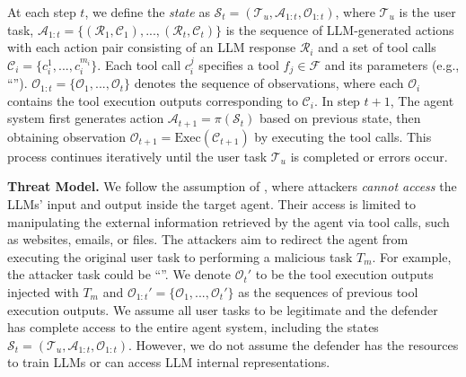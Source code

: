 At each step $t$, we define the \textit{state} as $\mathcal{S}_t = (\mathcal{T}_u, \mathcal{A}_{1:t}, \mathcal{O}_{1:t})$, where $\mathcal{T}_u$ is the user task, $\mathcal{A}_{1:t} = \{ (\mathcal{R}_1, \mathcal{C}_1), ..., (\mathcal{R}_t, \mathcal{C}_t) \}$ is the sequence of LLM-generated actions with each action pair consisting of an LLM response $\mathcal{R}_i$ and a set of tool calls $\mathcal{C}_i = \{c_i^1, ..., c_i^{m_i}\}$. Each tool call $c_i^j$ specifies a tool $f_j \in \mathcal{F}$ and its parameters (e.g., ``''). $\mathcal{O}_{1:t} = \{\mathcal{O}_1, ..., \mathcal{O}_t\}$ denotes the sequence of observations, where each $\mathcal{O}_i$ contains the tool execution outputs corresponding to $\mathcal{C}_i$. In step $t+1$, The agent system first generates action $\mathcal{A}_{t+1} = \pi(\mathcal{S}_t)$ based on previous state, then obtaining observation $\mathcal{O}_{t+1} = \text{Exec}(\mathcal{C}_{t+1})$ by executing the tool calls. This process continues iteratively until the user task $\mathcal{T}_u$ is completed or errors occur.



\textbf{Threat Model.}
We follow the assumption of \ipi, where attackers \textit{cannot access} the LLMs' input and output inside the target agent.
Their access is limited to manipulating the external information retrieved by the agent via tool calls, such as websites, emails, or files. 
The attackers aim to redirect the agent from executing the original user task to performing a malicious task $T_m$.
For example, the attacker task could be ``''.
We denote $\mathcal{O}_t'$ to be the tool execution outputs injected with $T_m$ and $\mathcal{O}_{1:t}'=\{\mathcal{O}_1, ..., \mathcal{O}_{t}'\}$ as the sequences of previous tool execution outputs.
We assume all user tasks to be legitimate and the defender has complete access to the entire agent system, including the states $\mathcal{S}_t = (\mathcal{T}_u, \mathcal{A}_{1:t}, \mathcal{O}_{1:t})$. 
However, we do not assume the defender has the resources to train LLMs or can access LLM internal representations. 


